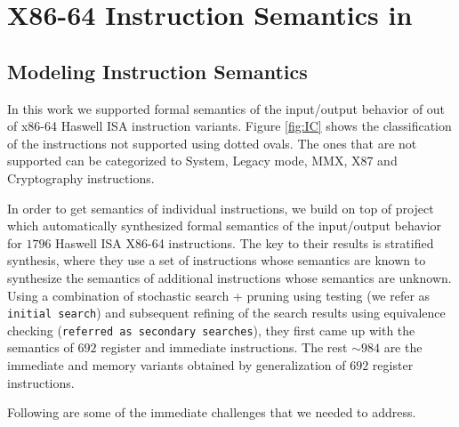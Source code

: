 
\section{X86-64 Instruction Semantics in \K} \label{sec:modelI}

\subsection{Modeling Instruction Semantics}


In this work we supported formal semantics of the input/output behavior of
\supp{} out of \total{} x86-64 Haswell ISA instruction variants. Figure \ref{fig:IC} shows the classification of the instructions not supported using dotted ovals. The ones that are not supported can be categorized to System, Legacy mode, MMX, X87 and Cryptography instructions.  


In order to get semantics of individual instructions, we build on top of project
\Strata~\cite{Heule2016a} which automatically synthesized formal semantics  of
the input/output behavior for $1796$ Haswell ISA X86-64 instructions. The key to
their results is stratified synthesis, where they use a set of instructions
whose semantics are known to synthesize the semantics of additional instructions
whose semantics are unknown. Using a  combination of stochastic search + pruning
using testing (we refer as {\tt initial search}) and subsequent refining of the
search results using equivalence checking ({\tt referred as secondary
    searches}), they first came up with the semantics of $692$ register and
 immediate instructions. The rest $\sim984$ are the immediate
and memory variants obtained by generalization of $692$ register instructions.     



Following are some of the immediate challenges that we needed to address.

